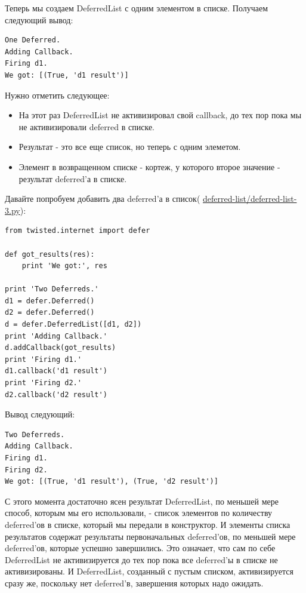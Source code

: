 Теперь мы создаем DeferredList с одним элементом в 
списке. Получаем следующий вывод:

\begin{scriptsize}\begin{verbatim}
One Deferred.
Adding Callback.
Firing d1.
We got: [(True, 'd1 result')]
\end{verbatim}\end{scriptsize}

Нужно отметить следующее:

\begin{itemize}

\item На этот раз DeferredList не активизировал свой callback, 
    до тех пор пока мы не активизировали deferred в списке.

\item Результат - это все еще список, но теперь с одним элеметом.

\item Элемент в возвращенном списке - кортеж, у которого второе значение - 
    результат deferred'а в списке.

\end{itemize}

Давайте попробуем добавить два deferred'а в список(
\href{http://github.com/jdavisp3/twisted-intro/blob/master/deferred-list/deferred-list-1.py#L3}{deferred-list/deferred-list-3.py}):

\begin{scriptsize}\begin{verbatim}
from twisted.internet import defer

def got_results(res):
    print 'We got:', res

print 'Two Deferreds.'
d1 = defer.Deferred()
d2 = defer.Deferred()
d = defer.DeferredList([d1, d2])
print 'Adding Callback.'
d.addCallback(got_results)
print 'Firing d1.'
d1.callback('d1 result')
print 'Firing d2.'
d2.callback('d2 result')
\end{verbatim}\end{scriptsize}

Вывод следующий:

\begin{scriptsize}\begin{verbatim}
Two Deferreds.
Adding Callback.
Firing d1.
Firing d2.
We got: [(True, 'd1 result'), (True, 'd2 result')]
\end{verbatim}\end{scriptsize}


С этого момента достаточно ясен результат DeferredList, 
по меньшей мере способ, которым мы его использовали, - 
список элементов по количеству deferred'ов в списке, 
который мы передали в конструктор. И элементы списка 
результатов содержат результаты первоначальных deferred'ов, 
по меньшей мере deferred'ов, которые успешно завершились. 
Это означает, что сам по себе DeferredList не активизируется 
до тех пор пока все deferred'ы в списке не активизированы. И 
DeferredList, созданный с пустым списком, активизируется 
сразу же, поскольку нет deferred'в, завершения которых 
надо ожидать.


